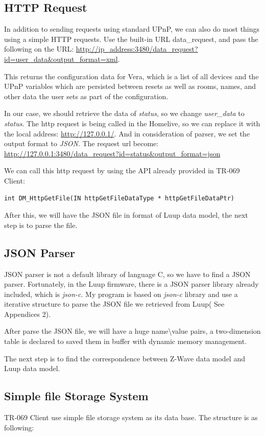 \subsection{HTTP Request}
In addition to sending requests using standard UPnP, we can also do most things using a simple HTTP requests. Use the built-in URL data_request, and pass the following on the URL: \url{http://ip_address:3480/data_request?id=user_data&output_format=xml}.

This returns the configuration data for Vera, which is a list of all devices and the UPnP variables which are persisted between resets as well as rooms, names, and other data the user sets as part of the configuration.

In our case, we should retrieve the data of \textit{status}, so we change \textit{user_data} to \textit{status}. The http request is being called in the Homelive, so we can replace it with the local address: \url{http://127.0.0.1/}. And in consideration of parser, we set the output format to \textit{JSON}. The request url become:\\
\url{http://127.0.0.1:3480/data_request?id=status&output_format=json}

We can call this http request by using the API already provided in TR-069 Client:
\begin{lstlisting}[mathescape]
    int DM_HttpGetFile(IN httpGetFileDataType * httpGetFileDataPtr)
\end{lstlisting}

After this, we will have the JSON file in format of Luup data model, the next step is to parse the file.

\subsection{JSON Parser}
JSON parser is not a default library of language C, so we have to find a JSON parser. Fortunately, in the Luup firmware, there is a JSON parser library already included, which is \textit{json-c}. My program is based on \textit{json-c} library and use a iterative structure to parse the JSON file we retrieved from Luup( See Appendices 2).

After parse the JSON file, we will have a huge name\textbackslash value pairs, a two-dimension table is declared to saved them in buffer with dynamic memory management.

The next step is to find the correspondence between Z-Wave data model and Luup data model.

\subsection{Simple file Storage System}
TR-069 Client use simple file storage system as its data base. The structure is as following:

